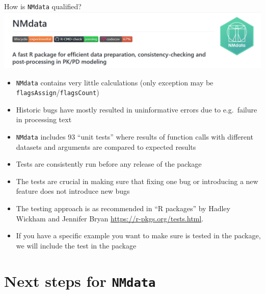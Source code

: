 \documentclass[
  8pt,
  ignorenonframetext,
  aspectratio=169]{beamer}
\begin{document}
\begin{frame}[fragile]{How is \texttt{NMdata} qualified?}
\protect\hypertarget{how-is-nmdata-qualified}{}
\includegraphics[width=.8\textwidth]{badges_snip}

\begin{itemize}
\item
  \texttt{NMdata} contains very little calculations (only exception may
  be \texttt{flagsAssign}/\texttt{flagsCount})
\item
  Historic bugs have mostly resulted in uninformative errors due to
  e.g.~failure in processing text
\item
  \texttt{NMdata} includes 93 ``unit tests'' where results of function
  calls with different datasets and arguments are compared to expected
  results
\item
  Tests are consistently run before any release of the package
\item
  The tests are crucial in making sure that fixing one bug or
  introducing a new feature does not introduce new bugs
\item
  The testing approach is as recommended in ``R packages'' by Hadley
  Wickham and Jennifer Bryan \url{https://r-pkgs.org/tests.html}.
\item
  If you have a specific example you want to make sure is tested in the
  package, we will include the test in the package
\end{itemize}
\end{frame}

\hypertarget{next-steps-for-nmdata}{%
\section{\texorpdfstring{Next steps for
\texttt{NMdata}}{Next steps for NMdata}}\label{next-steps-for-nmdata}}
\end{document}
